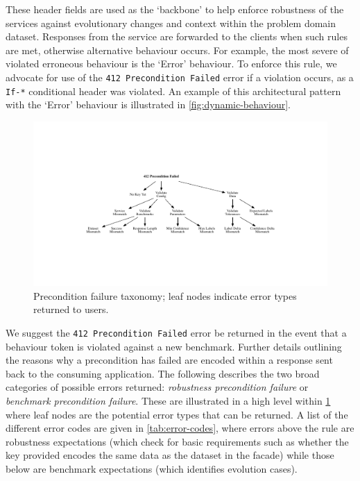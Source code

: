 These  header fields are used as the `backbone' to help enforce robustness of the services against evolutionary changes and context within the problem domain dataset. Responses from the service are forwarded to the clients when such rules are met, otherwise alternative behaviour occurs. For example, the most severe of violated erroneous behaviour is the `Error' behaviour. To enforce this rule, we advocate for use of the \texttt{412 Precondition Failed}  error if a violation occurs, as a \texttt{If-*} conditional header was violated. An example of this architectural pattern with the `Error' behaviour is illustrated in \cref{fig:dynamic-behaviour}. 

\begin{figure}[t]
    \centering
    \includegraphics[width=\linewidth]{precondition-failed}
    \caption[Precondition failure taxonomy]{Precondition failure taxonomy; leaf nodes indicate error types returned to users.}
    \label{fig:precondition-failed}
\end{figure}

We suggest the \texttt{412 Precondition Failed}  error be returned in the event that a behaviour token is violated against a new benchmark. Further details outlining the reasons why a precondition has failed are encoded within a  response sent back to the consuming application. The following describes the two broad categories of possible errors returned: \textit{robustness precondition failure} or \textit{benchmark precondition failure}. These are illustrated in a high level within \cref{fig:precondition-failed} where leaf nodes are the potential error types that can be returned. A list of the different error codes are given in \cref{tab:error-codes}, where errors above the rule are robustness expectations (which check for basic requirements such as whether the key provided encodes the same data as the dataset in the facade) while those below are benchmark expectations (which identifies evolution cases).

